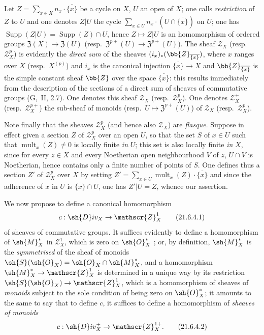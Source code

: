\begin{env}[21.6.3]
\label{IV.21.6.3}
Let $Z=\sum_{x\in X}n_x\cdot\overline{\{x\}}$ be a cycle on $X$, $U$ an open of $X$; one calls \emph{restriction} of $Z$ to $U$ and one denotes $Z|U$ the cycle $\sum_{x\in U}n_x\cdot(U\cap\overline{\{x\}})$ on $U$;
one has $\operatorname{Supp}(Z|U)=\operatorname{Supp}(Z)\cap U$, hence $Z\mapsto Z|U$ is an homomorphism of ordered groups $\mathfrak{Z}(X)\to\mathfrak{Z}(U)$ (resp.\ $\mathfrak{Z}^{p+}(U)\to\mathfrak{Z}^{p+}(U)$).
The sheaf $\mathscr{Z}_X$ (resp.\ $\mathscr{Z}_X^p$) is evidently the \emph{direct sum} of the sheaves $(i_x)_*(\bb{Z}_{\overline{\{x\}}})$, where $x$ ranges over $X$ (resp.\ $X^{(p)}$) and $i_x$ is the canonical injection $\overline{\{x\}}\to X$ and $\bb{Z}_{\overline{\{x\}}}$ is the simple constant sheaf $\bb{Z}$ over the space $\overline{\{x\}}$:
this results immediately from the description of the sections of a direct sum of sheaves of commutative groups (G,~II, 2.7).
One denotes this sheaf $\mathscr{Z}_X$ (resp.\ $\mathscr{Z}_X^p$).
One denotes $\mathscr{Z}_X^+$ (resp.\ $\mathscr{Z}_X^{p+}$) the sub-sheaf of monoids (resp.\ $U\mapsto\mathfrak{Z}^{p+}(U)$) of $\mathscr{Z}_X$ (resp.\ $\mathscr{Z}_X^p$).

Note finally that the sheaves $\mathscr{Z}_X^p$ (and hence also $\mathscr{Z}_X$) are \emph{flasque}.
Suppose in effect given a section $Z$ of $\mathscr{Z}_X^p$ over an open $U$, so that the set $S$ of $x\in U$ such that $\operatorname{mult}_x(Z)\neq 0$ is locally finite \emph{in} $U$;
this set is also locally finite \emph{in} $X$, since for every $z\in X$ and every Noetherian open neighbourhood $V$ of $z$, $U\cap V$ is Noetherian, hence contains only a finite number of points of $S$.
One defines thus a section $Z'$ of $\mathscr{Z}_X^p$ over $X$ by setting $Z'=\sum_{x\in U}\operatorname{mult}_x(Z)\cdot\overline{\{x\}}$ and since the adherence of $x$ in $U$ is $\overline{\{x\}}\cap U$, one has $Z'|U=Z$, whence our assertion.
\end{env}

\begin{env}[21.6.4]
\label{IV.21.6.4}
We now propose to define a canonical homomorphism
\[
\label{IV.21.6.4.1}
  c:\sh{D}iv_X\to\mathscr{Z}_X^1
  \tag{21.6.4.1}
\]
of sheaves of commutative groups.
It suffices evidently to define a homomorphism of $\sh{M}_X^*$ in $\mathscr{Z}_X^1$, which is zero on $\sh{O}_X^*$ ;
or, by definition, $\sh{M}_X^*$ is the \emph{symmetrised} of the sheaf of monoids $\sh{S}(\sh{O}_X)=\sh{O}_X\cap\sh{M}_X^*$, and a homomorphism $\sh{M}_X^*\to\mathscr{Z}_X^1$ is determined in a unique way by its restriction $\sh{S}(\sh{O}_X)\to\mathscr{Z}_X^1$, which is a homomorphism of sheaves of \emph{monoids} subject to the sole condition of being zero on $\sh{O}_X^*$;
it amounts to the same to say that to define $c$, it suffices to define a homomorphism of \emph{sheaves of monoids}
\[
\label{IV.21.6.4.2}
  c:\sh{D}iv_X^+\to\mathscr{Z}_X^{1+}.
  \tag{21.6.4.2}
\]
\end{env}

